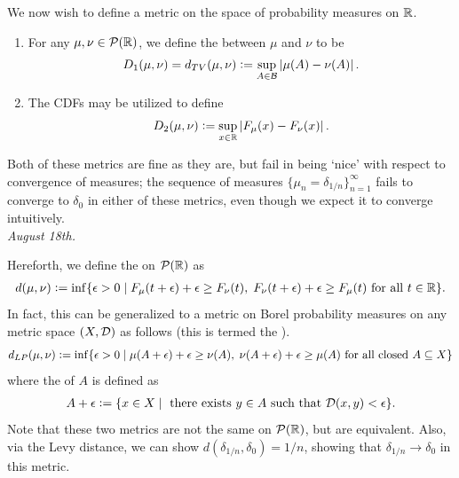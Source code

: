 We now wish to define a metric on the space of probability measures on $\mathbb{R}$.
\begin{enumerate}
    \item For any $\mu,\nu \in \mathcal{P}(\mathbb{R})$, we define the  between $\mu$ and $\nu$ to be
    \begin{align}
        D_{1}(\mu,\nu) = d_{TV}(\mu,\nu) \vcentcolon= \sup_{A \in \mathcal{B}} \left| \mu(A) - \nu(A) \right|.
    \end{align}
    \item The CDFs may be utilized to define
    \begin{align}
        D_{2}(\mu,\nu) \vcentcolon= \sup_{x \in \mathbb{R}} \left| F_{\mu}(x) - F_{\nu}(x) \right|.
    \end{align}
\end{enumerate}

Both of these metrics are fine as they are, but fail in being `nice' with respect to convergence of measures; the sequence of measures $\{\mu_{n} = \delta_{1/n}\}_{n=1}^{\infty}$ fails to converge to $\delta_{0}$ in either of these metrics, even though we expect it to converge intuitively.
\\

\noindent \textit{August 18th.}

Hereforth, we define the  on $\mathcal{P}(\mathbb{R})$ as
\begin{align}
    d(\mu,\nu) \vcentcolon= \inf\{\epsilon > 0 \mid F_{\mu}(t+\epsilon)+\epsilon \geq F_{\nu}(t), \; F_{\nu}(t+\epsilon)+\epsilon \geq F_{\mu}(t) \text{ for all } t \in \mathbb{R}\}.
\end{align}
In fact, this can be generalized to a metric on Borel probability measures on any metric space $(X,\mathcal{D})$ as follows (this is termed the ).
\begin{align}
    d_{LP}(\mu,\nu) \vcentcolon= \inf\{\epsilon > 0 \mid \mu(A+\epsilon)+\epsilon \geq \nu(A), \; \nu(A+\epsilon)+\epsilon \geq \mu(A) \text{ for all closed } A \subseteq X\}
\end{align}
where the  of $A$ is defined as
\begin{align}
    A+\epsilon \vcentcolon= \{x \in X \mid \text{ there exists } y \in A \text{ such that } \mathcal{D}(x,y) < \epsilon\}.
\end{align}
Note that these two metrics are not the same on $\mathcal{P}(\mathbb{R})$, but are equivalent. Also, via the Levy distance, we can show $d(\delta_{1/n},\delta_{0}) = 1/n$, showing that $\delta_{1/n} \to \delta_{0}$ in this metric.
\\

